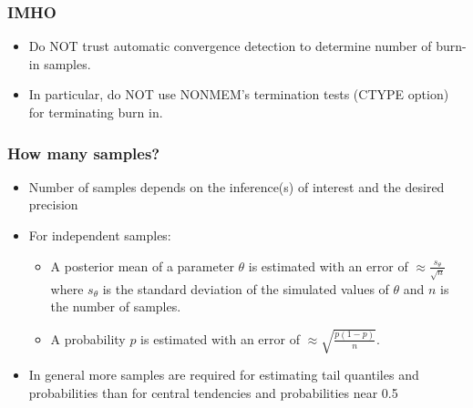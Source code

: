 \documentclass[handout]{beamer}
\begin{document}
\begin{frame}
\frametitle{IMHO}  

  \begin{itemize}
\item Do NOT trust automatic convergence detection to determine number
of burn-in samples. 
\item In particular, do NOT use NONMEM's termination tests (CTYPE
  option) for terminating burn in.
  \end{itemize}


\end{frame}

\begin{frame}
  \frametitle{How many samples?}
  
\begin{itemize}
\item Number of samples depends on the inference(s) of interest and the desired precision
\item For independent samples:
\begin{itemize}
\item A posterior mean of a parameter $\theta$ is estimated with an error of $\approx \frac{s_\theta}{\sqrt{n}}$ where $s_\theta$ is the standard deviation of the simulated values of $\theta$ and $n$ is the number of samples.
\item A probability $p$ is estimated with an error of $\approx \sqrt{\frac{p(1-p)}{n}}$.
\end{itemize}
\item In general more samples are required for estimating tail quantiles and probabilities than for central tendencies and probabilities near 0.5
\end{itemize}

\end{frame}
\end{document}
